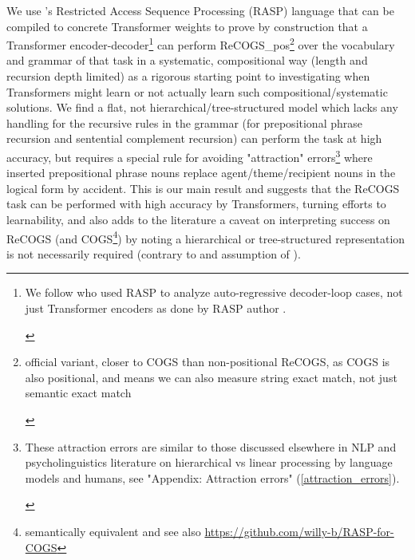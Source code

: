 \documentclass[11pt]{article}
\begin{document}
We use \citep{Weiss2021}'s Restricted Access Sequence Processing (RASP) language that can be compiled to concrete Transformer weights to prove by construction that a Transformer encoder-decoder\footnote{\begin{footnotesize}We follow \citep{Zhou2024} who used RASP to analyze auto-regressive decoder-loop cases, not just Transformer encoders as done by RASP author \citep{Weiss2021}.\end{footnotesize}} can perform ReCOGS\_pos\footnote{\begin{footnotesize}official variant, closer to COGS than non-positional ReCOGS, as COGS is also positional, and means we can also measure string exact match, not just semantic exact match\end{footnotesize}} over the vocabulary and grammar of that task in a systematic, compositional way (length and recursion depth limited) as a rigorous starting point to investigating when Transformers might learn or not actually learn such compositional/systematic solutions. We find a flat, not hierarchical/tree-structured model which lacks any handling for the recursive rules in the grammar (for prepositional phrase recursion and sentential complement recursion) can perform the task at high accuracy, but requires a special rule for avoiding "attraction" errors\footnote{\begin{footnotesize}These attraction errors are similar to those discussed elsewhere in NLP and psycholinguistics literature on hierarchical vs linear processing by language models and humans, see "Appendix: Attraction errors" (\ref{attraction_errors}).\end{footnotesize}} where inserted prepositional phrase nouns replace agent/theme/recipient nouns in the logical form by accident. This is our main result and suggests that the ReCOGS task can be performed with high accuracy by Transformers, turning efforts to learnability, and also adds to the literature a caveat on interpreting success on ReCOGS (and COGS\footnote{semantically equivalent and see also \href{https://github.com/willy-b/RASP-for-COGS}{https://github.com/willy-b/RASP-for-COGS}}) by noting a hierarchical or tree-structured representation is not necessarily required (contrary to \citep{KimLinzen2020} and assumption of \citep{murty2022characterizingintrinsiccompositionalitytransformers}).
\end{document}
